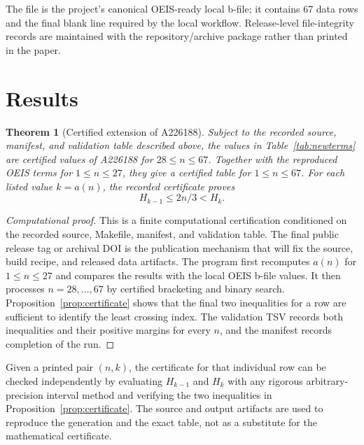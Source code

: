 \documentclass[11pt]{article}
\newtheorem{theorem}{Theorem}
\theoremstyle{definition}
\theoremstyle{remark}
\begin{document}
The file  is the project's canonical OEIS-ready local
b-file; it contains 67 data rows and the final blank line required by the
local workflow.  Release-level file-integrity records are maintained with the
repository/archive package rather than printed in the paper.

\section{Results}

\begin{theorem}[Certified extension of A226188]
\label{thm:main}
Subject to the recorded source, manifest, and validation table described
above, the values in Table~\ref{tab:newterms} are certified values of A226188
for \(28\leq n\leq 67\).  Together with the reproduced OEIS terms for
\(1\leq n\leq 27\), they give a certified table for \(1\leq n\leq 67\).
For each listed value \(k=a(n)\), the recorded certificate proves
\[
  H_{k-1}\leq 2n/3 < H_k.
\]
\end{theorem}

\begin{proof}[Computational proof]
This is a finite computational certification conditioned on the recorded
source, Makefile, manifest, and validation table.  The final public release
tag or archival DOI is the publication mechanism that will fix the source,
build recipe, and released data artifacts.
The program first recomputes \(a(n)\) for \(1\leq n\leq 27\) and compares the
results with the local OEIS b-file values.  It then processes \(n=28,\ldots,67\)
by certified bracketing and binary search.  Proposition~\ref{prop:certificate}
shows that the final two inequalities for a row are sufficient to identify the
least crossing index.  The validation TSV records both inequalities and their
positive margins for every \(n\), and the manifest records completion of the
run.
\end{proof}

Given a printed pair \((n,k)\), the certificate for that individual row can be
checked independently by evaluating \(H_{k-1}\) and \(H_k\) with any rigorous
arbitrary-precision interval method and verifying the two inequalities in
Proposition~\ref{prop:certificate}.  The source and output artifacts are used
to reproduce the generation and the exact table, not as a substitute for the
mathematical certificate.
\end{document}
